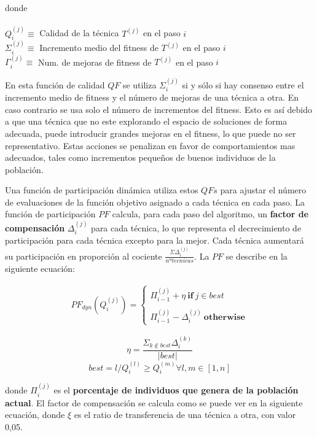 donde \\ \\
$Q_i^{(j)} \equiv$ Calidad de la técnica $T^{(j)}$ en el paso $i$\\
$\Sigma_i^{(j)} \equiv$ Incremento medio del fitness de $T^{(j)}$ en el paso $i$\\
$\Gamma_i^{(j)} \equiv$ Num. de mejoras de fitness de $T^{(j)}$ en el paso $i$	

En esta función de calidad $QF$ se utiliza $\Sigma_{i}^{(j)}$ si y sólo si hay consenso entre el incremento medio de fitness y el número de mejoras de una técnica a otra. En caso contrario se usa solo el número de incrementos del fitness. Esto es así debido a que una técnica que no este explorando el espacio de soluciones de forma adecuada, puede introducir grandes mejoras en el fitness, lo que puede no ser representativo. Estas acciones se penalizan en favor de comportamientos mas adecuados, tales como incrementos pequeños de buenos individuos de la población.

Una función de participación dinámica utiliza estos $QFs$ para ajustar el número de evaluaciones de la función objetivo asignado a cada técnica en cada paso. La función de participación $PF$ calcula, para cada paso del algoritmo, un \textbf{factor de compensación} $\Delta_i^{(j)}$ para cada técnica, lo que representa el decrecimiento de participación para cada técnica excepto para la mejor. Cada técnica aumentará su participación en proporción al cociente $\frac{\Sigma \Delta_{i}^{(j)}}{nº tecnicas}$. La $PF$ se describe en la siguiente ecuación:

\begin{equation}\label{eq:PF_MOS}
	\begin{gathered}
		PF_{dyn}(Q_i^{(j)} )= \begin{cases}
			\Pi_{i-1}^{(j)} + \eta \ \textbf{if} \ j \in best \\ \\
			\Pi_{i-1}^{(j)} - \Delta_i^{(j)} \ \textbf{otherwise}
		\end{cases}
	\end{gathered}
\end{equation}

$$
\eta = \frac{\Sigma_{k\notin best}\Delta_i^{(k)}}{|best|}
$$
$$
best = {l/Q_i^{(l)} \geq Q_i^{(m)} \forall l,m \in [1,n]}
$$

donde $\Pi_i^{(j)}$ es el \textbf{porcentaje de individuos que genera de la población actual}. El factor de compensación se calcula como se puede ver en la siguiente ecuación, donde $\xi$ es el ratio de transferencia de una técnica a otra, con valor 0,05.

